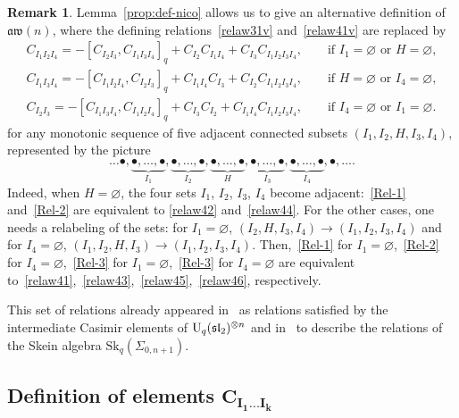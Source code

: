 \documentclass[pdftex]{sigma}
\numberwithin{equation}{section}
\theoremstyle{definition}
\newtheorem{rema}[theo]{Remark}
\newcommand{\aw}{\mathfrak{aw}(n)}
\begin{document}
\begin{rema}%
Lemma~\ref{prop:def-nico} allows us to give an alternative definition of $\aw$, where the defining relations~\eqref{relaw31v} and~\eqref{relaw41v}
are replaced by
 \begin{subequations}
\begin{gather}
C_{I_1I_2I_4}=- [C_{I_2I_3},C_{I_1I_3I_4}]_q + C_{I_2}C_{I_1I_4}+C_{I_3}C_{I_1I_2I_3I_4} , \qquad\text{if $I_1=\varnothing$ or $H=\varnothing$} ,\label{Rel-1}\\
C_{I_1I_3I_4}=-[C_{I_1I_2I_4},C_{I_2I_3}]_q +C_{I_1I_4}C_{I_3}+C_{I_2}C_{I_1I_2I_3I_4} ,\qquad\text{if $H=\varnothing$ or $I_4=\varnothing$} ,\label{Rel-2}\\
C_{I_2I_3}=-[C_{I_1I_3I_4},C_{I_1I_2I_4}]_q + C_{I_3}C_{I_2}+C_{I_1I_4}C_{I_1I_2I_3I_4} ,\qquad\text{if $I_4=\varnothing$ or $I_1=\varnothing$}.\label{Rel-3}
\end{gather}
 \end{subequations}
for any monotonic sequence of five adjacent connected subsets $(I_1,I_2,H,I_3,I_4)$, represented by the picture
\[\ldots \bullet,\underbrace{\bullet,\dots,\bullet}_{I_1},\underbrace{\bullet,\dots,\bullet}_{I_2},\underbrace{\bullet,\dots,\bullet}_{H},
\underbrace{\bullet,\dots,\bullet}_{I_3},\underbrace{\bullet,\dots,\bullet}_{I_4},\bullet,\ldots .\]
Indeed, when $H=\varnothing$, the four sets $I_1$, $I_2$, $I_3$, $I_4$ become adjacent:~\eqref{Rel-1} and~\eqref{Rel-2} are equivalent to
\eqref{relaw42} and~\eqref{relaw44}. For the other cases, one needs a relabeling of the sets: for $I_1=\varnothing$,
$(I_2,H,I_3,I_4)\to(I_1,I_2,I_3,I_4)$ and for $I_4=\varnothing$,
$(I_1,I_2,H,I_3)\to(I_1,I_2,I_3,I_4)$. Then,~\eqref{Rel-1} for $I_1=\varnothing$,~\eqref{Rel-2} for $I_4=\varnothing$,~\eqref{Rel-3} for $I_1=\varnothing$,~\eqref{Rel-3} for $I_4=\varnothing$ are equivalent to~\eqref{relaw41},~\eqref{relaw43},~\eqref{relaw45},~\eqref{relaw46}, respectively.

This set of relations already appeared in~\cite{DeC} as relations satisfied by the intermediate Casimir elements of ${\rm U}_q(\mathfrak{sl}_2)^{\otimes n}$ and in~\cite{CL} to describe the relations
of the Skein algebra $\text{Sk}_q(\Sigma_{0,n+1})$.
\end{rema}

\subsection[Definition of elements C\_\{I\_1\dots I\_k\}]{Definition of elements $\boldsymbol{C_{I_1\dots I_k}}$}%
\end{document}
